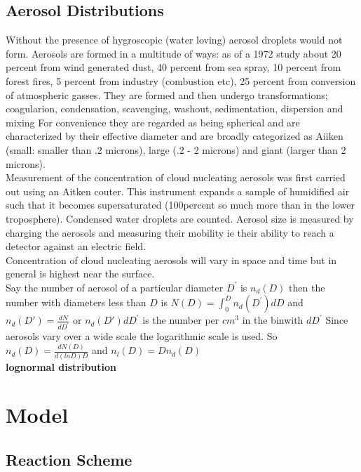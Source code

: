 \documentclass[11pt]{article} %
\begin{document}
\subsection{Aerosol Distributions}

Without the presence of hygroscopic (water loving) aerosol droplets would not form.  Aerosols are formed in a multitude of ways: as of a 1972 study about 20 percent from wind generated dust, 40 percent from sea spray, 10 percent from forest fires, 5 percent from industry (combustion etc), 25 percent from conversion of atmospheric gasses.  They are formed and then undergo transformations; coagularion, condensation, scavenging, washout, sedimentation, dispersion and mixing   For convenience they are regarded as being spherical and are characterized by their effective diameter and are broadly categorized as Aiiken (small: smaller than .2 microns), large (.2 - 2 microns) and giant (larger than 2 microns).\\

Measurement of the concentration of cloud nucleating aerosols was first carried out using an Aitken couter.  This instrument expands a sample of humidified air such that it becomes supersaturated (100percent so much more than in the lower troposphere).  Condensed water droplets are counted.  Aerosol size is measured by charging the aerosols and measuring their mobility ie their ability to reach a detector against an electric field.\\

Concentration of cloud nucleating aerosols will vary in space and time but in general is highest near the surface.\\

Say the number of aerosol of a particular diameter $D^{'}$ is $n_{d}(D)$ then the number with diameters less than $D$ is $N(D)=\int^{D}_{0}n_{d}(D^{'})dD$ and $n_{d}(D') = \frac{dN}{dD^{'}}$  or $n_{d}(D')dD^{'}$ is the number per $cm^{3}$ in the binwith $dD^{'}$ Since aerosols vary over a wide scale the logarithmic scale is used. So $n_{d}(D) = \frac{dN(D)}{d(lnD) D}$ and $n_{l}(D) = D n_{d}(D)$\\

\bf{lognormal distribution}

\section{Model}

\subsection{Reaction Scheme}
\end{document}
